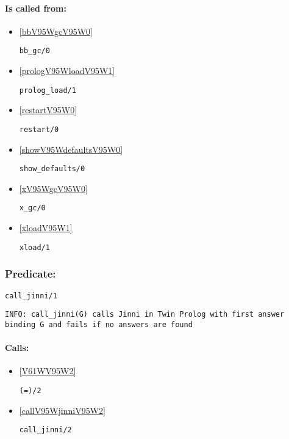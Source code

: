 \paragraph{Is called from:} 
\begin{itemize}
\item \ref{bbV95WgcV95W0} 
\begin{verbatim}
bb_gc/0
\end{verbatim}

\item \ref{prologV95WloadV95W1} 
\begin{verbatim}
prolog_load/1
\end{verbatim}

\item \ref{restartV95W0} 
\begin{verbatim}
restart/0
\end{verbatim}

\item \ref{showV95WdefaultsV95W0} 
\begin{verbatim}
show_defaults/0
\end{verbatim}

\item \ref{xV95WgcV95W0} 
\begin{verbatim}
x_gc/0
\end{verbatim}

\item \ref{xloadV95W1} 
\begin{verbatim}
xload/1
\end{verbatim}

\end{itemize}

\subsubsection{Predicate:} \label{callV95WjinniV95W1}

\begin{verbatim}
call_jinni/1
\end{verbatim}

{\small \begin{verbatim}
INFO: call_jinni(G) calls Jinni in Twin Prolog with first answer binding G and fails if no answers are found

\end{verbatim}}
\paragraph{Calls:} 
\begin{itemize}
\item \ref{V61WV95W2} 
\begin{verbatim}
(=)/2
\end{verbatim}

\item \ref{callV95WjinniV95W2} 
\begin{verbatim}
call_jinni/2
\end{verbatim}

\end{itemize}

